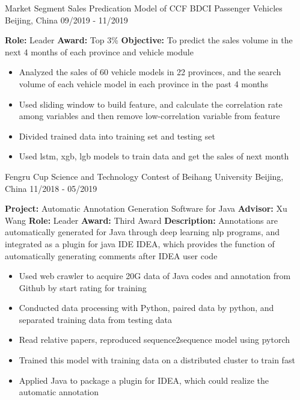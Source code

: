 

\begin{cventries}

  \cventry
    {}
    {Market Segment Sales Predication Model of CCF BDCI Passenger Vehicles}
    {Beijing, China}
    {09/2019 - 11/2019}
    {
      \textbf{Role:} Leader
      \newline
      \textbf{Award:} Top 3\%
      \newline
      \textbf{Objective:} To predict the sales volume in the next 4 months of each province and vehicle module
      \begin{itemize}
        \item {Analyzed the sales of 60 vehicle models in 22 provinces, and the search volume of each vehicle model in each province in the past 4 months}
        \item {Used sliding window to build feature, and calculate the correlation rate among variables and then remove low-correlation variable from feature}
        \item {Divided trained data into training set and testing set}
        \item {Used lstm, xgb, lgb models to train data and get the sales of next month}
      \end{itemize}
    }
  
  \cventry
    {}
    {Fengru Cup Science and Technology Contest of Beihang University}
    {Beijing, China}
    {11/2018 - 05/2019}
    {
      \textbf{Project:} Automatic Annotation Generation Software for Java \quad \textbf{Advisor:} Xu Wang
      \newline
      \textbf{Role:} Leader
      \newline
      \textbf{Award:} Third Award
      \newline
      \textbf{Description:} Annotations are automatically generated for Java through deep learning nlp programs, and integrated as a plugin for java IDE IDEA, which provides the function of automatically generating comments after IDEA user code
      \begin{itemize}
        \item {Used web crawler to acquire 20G data of Java codes and annotation from Github by start rating for training}
        \item {Conducted data processing with Python, paired data by python, and separated training data from testing data}
        \item {Read relative papers, reproduced sequence2sequence model using pytorch}
        \item {Trained this model with training data on a distributed cluster to train fast}
        \item {Applied Java to package a plugin for IDEA, which could realize the automatic annotation}
      \end{itemize}
    }

\end{cventries}
